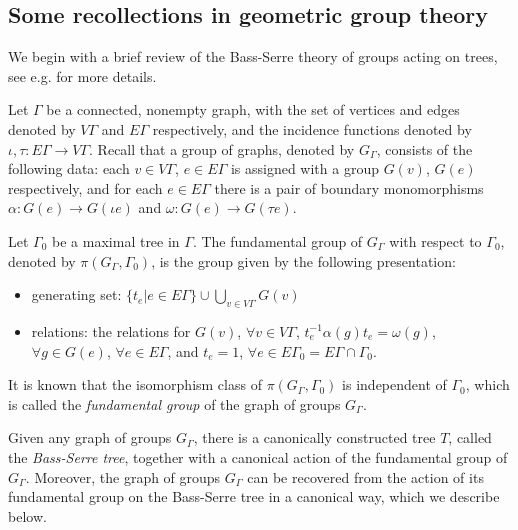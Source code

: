 \documentclass[11pt]{amsart}
\theoremstyle{plain}
\numberwithin{theorem}{section}
\theoremstyle{definition}
\begin{document}
\subsection{Some recollections in geometric group theory}
We begin with a brief review of the Bass-Serre theory of groups acting on trees, see e.g. 
\cite{DD, SW} for more details. 

Let $\Gamma$ be a connected, nonempty graph, with the set of vertices and edges denoted by
$V\Gamma$ and $E\Gamma$ respectively, and the incidence functions denoted by $\iota,\tau:
E\Gamma\rightarrow V\Gamma$. Recall that a group of graphs, denoted by $G_\Gamma$,
consists of the following data: each $v\in V\Gamma$, $e\in E\Gamma$ is assigned with a group
$G(v)$, $G(e)$ respectively, and for each $e\in E\Gamma$ there is a pair of boundary monomorphisms 
$\alpha: G(e)\rightarrow G(\iota e)$ and $\omega: G(e)\rightarrow G(\tau e)$. 

Let $\Gamma_0$ be a maximal tree in $\Gamma$. The fundamental group of $G_\Gamma$ 
with respect to $\Gamma_0$, denoted by $\pi(G_\Gamma,\Gamma_0)$, is the group given by
the following presentation:
\begin{itemize}
\item generating set: $\{t_e|e\in E\Gamma\}\cup \bigcup_{v\in V\Gamma}G(v)$
\item relations: the relations for $G(v)$, $\forall v\in V\Gamma$, $t^{-1}_e\alpha(g)t_e=\omega(g)$,
$\forall g\in G(e)$, $\forall e\in E\Gamma$, and $t_e=1$, $\forall e\in E\Gamma_0=E\Gamma\cap\Gamma_0$.
\end{itemize}
It is known that the isomorphism class of $\pi(G_\Gamma,\Gamma_0)$ is independent of $\Gamma_0$,
which is called the {\it  fundamental group} of the graph of groups $G_\Gamma$.

Given any graph of groups $G_\Gamma$, there is a canonically constructed tree $T$, called the
{\it Bass-Serre tree}, together with a canonical action of the fundamental group of $G_\Gamma$. 
Moreover, the graph of groups $G_\Gamma$ can be recovered from the action of its fundamental 
group on the Bass-Serre tree in a canonical way, which we describe below.
\end{document}
